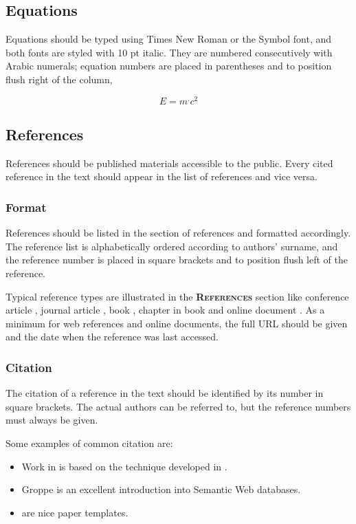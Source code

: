 \documentclass{ronpub}  %
\begin{document}
\subsection{Equations}

Equations should be typed using Times New Roman or the Symbol font, and both fonts are styled with 10 pt italic. They are numbered consecutively with Arabic numerals; equation numbers are placed in parentheses and to position flush right of the column,

\begin{equation}
E = m ^. c^2
\end{equation}

\subsection{References}

References should be published materials accessible to the public. Every cited reference in the text should appear in the list of references and vice versa.

\subsubsection{Format}

References should be listed in the section of references and formatted accordingly. The reference list is alphabetically ordered according to authors' surname, and the reference number is placed in square brackets and to position flush left of the reference.

Typical reference types are illustrated in the \textbf{\scshape \selectfont References} section
like conference article \cite{AS13}, journal article \cite{AS12}, book \cite{Gro11}, chapter in book \cite{DrFlGr09} and online document \cite{A13}.
As a minimum for web references and online documents, the full URL should be given and the date when the reference was last accessed.

\subsubsection{Citation}

The citation of a reference in the text should be identified by its number in square brackets. The actual authors can be referred to, but the reference numbers must always be given.

Some examples of common citation are:

\begin{itemize}
\item Work in \cite{AS12} is based on the technique developed in \cite{AS13}.
\item Groppe \cite{Gro11} is an excellent introduction into Semantic Web databases.
\item \cite{ACM13} \cite{IEEE13a} \cite{IEEE13b} are nice paper templates.
\end{itemize}
\end{document}
